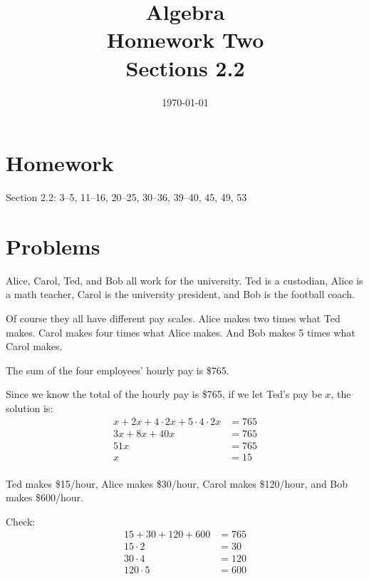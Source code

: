 \documentclass[letterpaper]{exam}
\title{Algebra \\ Homework Two \\ Sections 2.2}
\author{}
\date{\today}
\begin{document}
  \maketitle

  \section{Homework}
  Section 2.2: 3--5, 11--16, 20--25, 30--36, 39--40, 45, 49, 53

  \section{Problems}

  \begin{questions}

    \question{}
    Alice, Carol, Ted, and Bob all work for the university.  Ted is a
    custodian, Alice is a math teacher, Carol is the university president, and
    Bob is the football coach.   

    Of course they all have different pay scales.  Alice makes two times what
    Ted makes.  Carol makes four times what Alice makes.  And Bob makes 5
    times what Carol makes.

    The sum of the four employees' hourly pay is \$765.

    \begin{solution}
      Since we know the total of the hourly pay is \$765, if we let Ted's pay
      be $x$, the solution is:  
      \begin{align*}
        x + 2x + 4 \cdot 2x + 5 \cdot 4 \cdot 2x & = 765 \\
        3x + 8x + 40x                            & = 765 \\
        51x                                      & = 765 \\
        x                                        & = 15 \\
      \end{align*}

    Ted makes \$15/hour, Alice makes \$30/hour, Carol makes \$120/hour, and
    Bob makes \$600/hour.

    Check:
      \begin{align*}
        15 + 30 + 120 + 600 & = 765 \\
        15 \cdot 2          & = 30  \\
        30 \cdot 4          & = 120 \\
        120 \cdot 5         & = 600 \\
      \end{align*}


\end{solution}
\end{questions}
\end{document}
